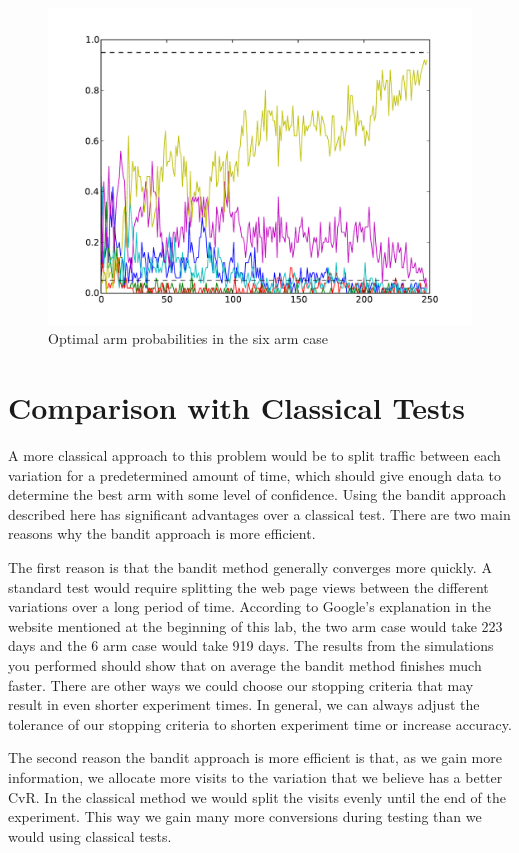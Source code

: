 \begin{figure}
\begin{center}
        \includegraphics[width=\textwidth]{./Applications/MarkDecProc/weights2.pdf}
        \caption{Optimal arm probabilities in the six arm case}
\end{center}
\end{figure}\label{fig:weights2}

\section*{Comparison with Classical Tests}
A more classical approach to this problem would be to split traffic between each variation for a predetermined amount of time, which should give enough data to determine the best arm with some level of confidence.  Using the bandit approach described here has significant advantages over a classical test.  There are two main reasons why the bandit approach is more efficient.

The first reason is that the bandit method generally converges more quickly.  A standard test would require splitting the web page views between the different variations over a long period of time.  According to Google's explanation in the website mentioned at the beginning of this lab, the two arm case would take 223 days and the 6 arm case would take 919 days.  The results from the simulations you performed should show that on average the bandit method finishes much faster.  There are other ways we could choose our stopping criteria that may result in even shorter experiment times.  In general, we can always adjust the tolerance of our stopping criteria to shorten experiment time or increase accuracy.

The second reason the bandit approach is more efficient is that, as we gain more information, we allocate more visits to the variation that we believe has a better CvR.  In the classical method we would split the visits evenly until the end of the experiment.  This way we gain many more conversions during testing than we would using classical tests.

